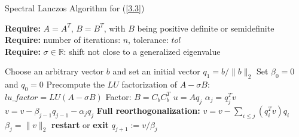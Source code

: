 \begin{algorithm}
	\caption{Spectral Lanczos Algorithm for (\ref{3.3}) }
	\label{alg:spectral_lanczos_algorithm}
	
	\textbf{Require:} \( A = A^T \), \( B = B^T \), with \(B\) being positive definite or semidefinite\\
	\textbf{Require:} number of iterations: \(n\), tolerance: \(tol\)\\
	\textbf{Require:} \(\sigma \in \mathbb{R}\): shift not close to a generalized eigenvalue
	\begin{algorithmic}[1]
		\State Choose an arbitrary vector $b$ and set an initial vector $q_1 = b/ \|b\|_2$
		\State Set $\beta_0 = 0$ and $q_0 = 0$
		\State Precompute the $LU$ factorization of $A - \sigma B$: $lu\_factor = LU(A - \sigma B)$
		\State Factor: $B = C_bC_b^T$
		\State $u = A q_j$
		\State $\alpha_j = q_j^T v $
		\State $v = v - \beta_{j-1}q_{j-1} - \alpha_j q_j$
		\State \textbf{Full reorthogonalization:} $v = v - \sum_{i \leq j} (q_i^T v) q_i$
		\State $\beta_{j} = \|v\|_2$
		\State \textbf{restart} or \textbf{exit}
		\EndIf
		\State $q_{j+1} := v / \beta_{j}$
		\EndFor
		\EndFunction
	\end{algorithmic}
\end{algorithm}\\

